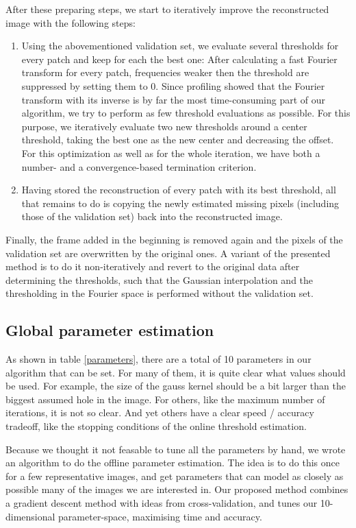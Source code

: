 \documentclass[10pt,conference,compsocconf]{IEEEtran}
\begin{document}
After these preparing steps, we start to iteratively improve the reconstructed image with the following steps:
\begin{enumerate}
\item Using the abovementioned validation set, we evaluate several thresholds for every patch and keep for each the best one: After calculating a fast Fourier transform for every patch, frequencies weaker then the threshold are suppressed by setting them to 0. Since profiling showed that the Fourier transform with its inverse is by far the most time-consuming part of our algorithm, we try to perform as few threshold evaluations as possible. For this purpose, we iteratively evaluate two new thresholds around a center threshold, taking the best one as the new center and decreasing the offset. For this optimization as well as for the whole iteration, we have both a number- and a convergence-based termination criterion.
\item Having stored the reconstruction of every patch with its best threshold, all that remains to do is copying the newly estimated missing pixels (including those of the validation set) back into the reconstructed image.
\end{enumerate}
Finally, the frame added in the beginning is removed again and the pixels of the validation set are overwritten by the original ones. A variant of the presented method is to do it non-iteratively and revert to the original data after determining the thresholds, such that the Gaussian interpolation and the thresholding in the Fourier space is performed without the validation set.

\subsection{Global parameter estimation}
As shown in table \ref{parameters}, there are a total of 10 parameters in our algorithm that can be set.
For many of them, it is quite clear what values should be used. For example, the size of the gauss kernel
should be a bit larger than the biggest assumed hole in the image. For others, like the maximum number of
iterations, it is not so clear. And yet others have a clear speed / accuracy tradeoff, like the stopping
conditions of the online threshold estimation.

Because we thought it not feasable to tune all the parameters by hand, we wrote an algorithm to
do the offline parameter estimation. The idea is to do this once for a few representative images, and get
parameters that can model as closely as possible many of the images we are interested in.
Our proposed method combines a gradient descent method with ideas from cross-validation, and tunes our
10-dimensional parameter-space, maximising time and accuracy.
\end{document}
